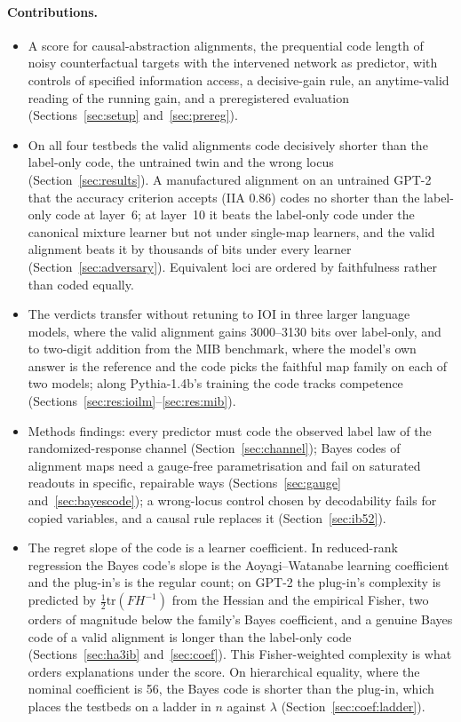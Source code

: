 \documentclass[11pt,a4paper]{article}
\begin{document}
\paragraph{Contributions.}
\begin{itemize}
\item A score for causal-abstraction alignments, the prequential code length of noisy counterfactual targets with the intervened network as predictor, with controls of specified information access, a decisive-gain rule, an anytime-valid reading of the running gain, and a preregistered evaluation (Sections~\ref{sec:setup} and~\ref{sec:prereg}).
\item On all four testbeds the valid alignments code decisively shorter than the label-only code, the untrained twin and the wrong locus (Section~\ref{sec:results}). A manufactured alignment on an untrained GPT-2 that the accuracy criterion accepts (IIA 0.86) codes no shorter than the label-only code at layer~6; at layer~10 it beats the label-only code under the canonical mixture learner but not under single-map learners, and the valid alignment beats it by thousands of bits under every learner (Section~\ref{sec:adversary}). Equivalent loci are ordered by faithfulness rather than coded equally.
\item The verdicts transfer without retuning to IOI in three larger language models, where the valid alignment gains 3000--3130 bits over label-only, and to two-digit addition from the MIB benchmark, where the model's own answer is the reference and the code picks the faithful map family on each of two models; along Pythia-1.4b's training the code tracks competence (Sections~\ref{sec:res:ioilm}--\ref{sec:res:mib}).
\item Methods findings: every predictor must code the observed label law of the randomized-response channel (Section~\ref{sec:channel}); Bayes codes of alignment maps need a gauge-free parametrisation and fail on saturated readouts in specific, repairable ways (Sections~\ref{sec:gauge} and~\ref{sec:bayescode}); a wrong-locus control chosen by decodability fails for copied variables, and a causal rule replaces it (Section~\ref{sec:ib52}).
\item The regret slope of the code is a learner coefficient. In reduced-rank regression the Bayes code's slope is the Aoyagi--Watanabe learning coefficient and the plug-in's is the regular count; on GPT-2 the plug-in's complexity is predicted by $\tfrac12\mathrm{tr}(FH^{-1})$ from the Hessian and the empirical Fisher, two orders of magnitude below the family's Bayes coefficient, and a genuine Bayes code of a valid alignment is longer than the label-only code (Sections~\ref{sec:ha3ib} and~\ref{sec:coef}). This Fisher-weighted complexity is what orders explanations under the score. On hierarchical equality, where the nominal coefficient is 56, the Bayes code is shorter than the plug-in, which places the testbeds on a ladder in $n$ against $\lambda$ (Section~\ref{sec:coef:ladder}).

\end{itemize}
\end{document}
